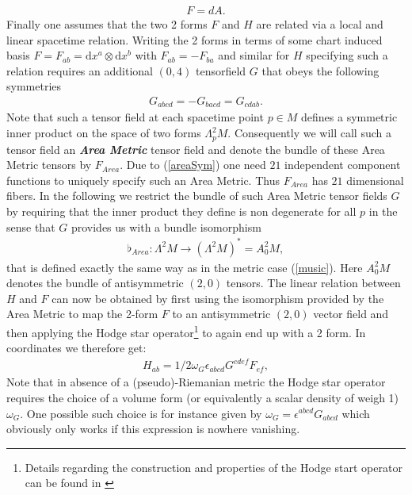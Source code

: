 \documentclass[a4paper,12pt, DIV=14, BCOR=5mm, twoside, headsepline, numbers=noenddot]{scrbook}
\begin{document}
\begin{align}
    F = d A.
\end{align}
Finally one assumes that the two 2 forms $F$ and $H$ are related via a local and linear spacetime relation. Writing the 2 forms in terms of some chart induced basis $F = F_{ab} = \mathrm{d}x^a \otimes \mathrm{d}x^b$ with $F_{ab} = - F_{ba}$ and similar for $H$ specifying such a relation requires an additional $(0,4)$ tensorfield $G$ that obeys the following symmetries
\begin{align}\label{areaSym}
    G_{abcd} = -G_{bacd} = G_{cdab}.
\end{align}
Note that such a tensor field at each spacetime point $p\in M$ defines a symmetric inner product on the space of two forms $\Lambda^2_pM$. Consequently we will call such a tensor field an \textbf{\textit{Area Metric}} tensor field and denote the bundle of these Area Metric tensors by $F_{Area}$. Due to (\ref{areaSym}) one need $21$ independent component functions to uniquely specify such an Area Metric. Thus $F_{Area}$ has $21$ dimensional fibers.   In the following we restrict the bundle of such Area Metric tensor fields $G$ by requiring that the inner product they define is non degenerate for all $p$ in the sense that $G$ provides us with a bundle isomorphism 
\begin{align}
\flat_{Area} : \Lambda^2M \longrightarrow (\Lambda^2M)^{\ast} = A^2_0M,
\end{align}
that is defined exactly the same way as in the metric case (\ref{music}). Here $A^2_0M$ denotes the bundle of antisymmetric $(2,0)$ tensors. 
The linear relation between $H$ and $F$ can now be obtained by first using the isomorphism provided by the Area Metric to map the 2-form $F$ to an antisymmetric $(2,0)$ vector field and then applying the Hodge star operator\footnote{Details regarding the construction and properties of the Hodge start operator can be found in \cite{Abraham:1988:MTA:50877}} to again end up with a 2 form. In coordinates we therefore get:
\begin{align}
    H_{ab} = 1/2 \omega_G \epsilon_{abcd} G^{cdef} F_{ef},
\end{align}
Note that in absence of a (pseudo)-Riemanian metric the Hodge star operator requires the choice of a volume form (or equivalently a scalar density of weigh 1) $\omega_G$. One possible such choice is for instance given by $\omega_G = \epsilon^{abcd}G_{abcd}$ which obviously only works if this expression is nowhere vanishing.
\end{document}
